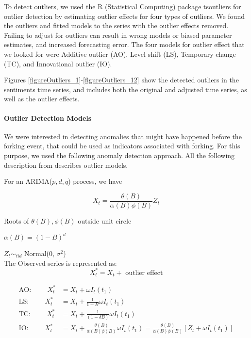 \documentclass[12pt]{report}
\begin{document}
To detect outliers, we used the R (Statistical Computing) \cite{R} package tsoutliers \cite{Lopez} for outlier detection by estimating outlier effects for four types of outliers. We found the outliers and fitted models to the series with the outlier effects removed. Failing to adjust for outliers can result in wrong models or biased parameter estimates, and increased forecasting error. The four models for outlier effect that we looked for were Additive outlier (AO), Level shift (LS), Temporary change (TC), and Innovational outlier (IO).

Figures \ref{figureOutliers_1}-\ref{figureOutliers_12} show the detected outliers in the sentiments time series, and includes both the original and adjusted time series, as well as the outlier effects.

\paragraph{Outlier Detection Models}

We were interested in detecting anomalies that might have happened before the forking event, that could be used as indicators associated with forking. For this purpose, we used the following anomaly detection approach. All the following description from \cite{Chen} describes outlier models. 

For an ARIMA($p, d, q$) process, we have 

\begin{equation}
X_t = \frac{\theta(B)}{\alpha(B) \phi(B)} Z_t 
\end{equation}

Roots of $\theta(B), \phi(B)$ outside unit circle

$\alpha(B) = (1 - B)^d$

$Z_t \sim_{iid}$ Normal(0, $\sigma^2$) \\

The Observed series is represented as:
\begin{equation}
X^*_t = X_t + \text{ outlier effect}
\end{equation}

\begin{align}
\text{AO:}\hspace{1cm}X^*_t &= X_t + \omega I_t(t_1) \\
\text{LS:}\hspace{1cm}X^*_t &= X_t + \frac{1}{1 - B} \omega I_t(t_1) \\
\text{TC:}\hspace{1cm}X^*_t &= X_t + \frac{1}{(1 - \delta B)} \omega I_t(t_1) \\
\text{IO:}\hspace{1cm}X^*_t &= X_t + \frac{\theta(B)}{\alpha(B) \phi(B)} \omega I_t(t_1) = \frac{\theta(B)}{\alpha(B) \phi(B)}\left[Z_t + \omega I_t(t_1)\right]
\end{align}
\end{document}
